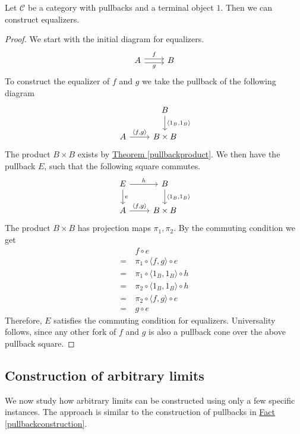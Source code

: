 \begin{theorem}
  \label{pullbackequalizer}
  Let $\mathscr C$ be a category with pullbacks and a terminal object $1$.
  Then we can construct equalizers.
\end{theorem}
\begin{proof}
  We start with the initial diagram for equalizers.
  \[
    \begin{tikzcd}
      A \arrow[shift left]{r}{f} \arrow[shift right, swap]{r}{g} & B
    \end{tikzcd}
  \]
  To construct the equalizer of $f$ and $g$ we take the pullback of the following diagram
  \[
    \begin{tikzcd}
      & B \arrow{d}{\langle 1_B, 1_B \rangle} \\
      A \arrow{r}{\langle f,g \rangle} & B \times B
    \end{tikzcd}
  \]
  The product $B \times B$ exists by \hyperref[pullbackproduct]{Theorem \ref*{pullbackproduct}}.
  We then have the pullback $E$, such that the following square commutes.
  \[
    \begin{tikzcd}
      E \arrow{r}{h} \arrow{d}{e} & B \arrow{d}{\langle 1_B, 1_B \rangle} \\
      A \arrow{r}{\langle f,g \rangle} & B \times B
    \end{tikzcd}
  \]
  The product $B \times B$ has projection maps $\pi_1, \pi_2$.
  By the commuting condition we get
  \begin{align*}
    & f \circ e \\
    =\ & \pi_1 \circ \langle f, g \rangle \circ e\\
    =\ & \pi_1 \circ \langle 1_B, 1_B \rangle \circ h\\
    =\ & \pi_2 \circ \langle 1_B, 1_B \rangle \circ h\\
    =\ & \pi_2 \circ \langle f,g \rangle \circ e\\
    =\ & g \circ e
  \end{align*}
  Therefore, $E$ satisfies the commuting condition for equalizers.
  Universality follows, since any other fork of $f$ and $g$ is also a pullback
  cone over the above pullback square.
\end{proof}

\subsection{Construction of arbitrary limits}
\label{arbitrarylimits}
We now study how arbitrary limits can be constructed using only a
few specific instances.
The approach is similar to the construction of pullbacks in
\hyperref[pullbackconstruction]{Fact \ref*{pullbackconstruction}}.

